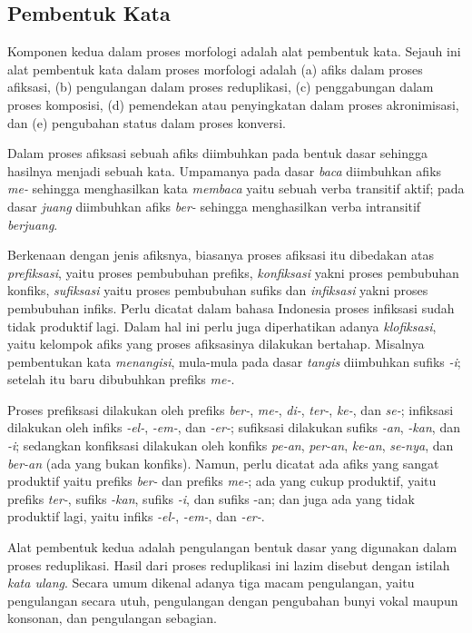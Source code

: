 \subsection{Pembentuk Kata}
\label{sec:pembentukKata}

Komponen kedua dalam proses morfologi adalah alat pembentuk kata. Sejauh ini alat pembentuk kata dalam proses morfologi adalah (a) afiks dalam proses afiksasi, (b) pengulangan dalam proses reduplikasi, (c) penggabungan dalam proses komposisi, (d) pemendekan atau penyingkatan dalam proses akronimisasi, dan (e) pengubahan status dalam proses konversi.

Dalam proses afiksasi sebuah afiks diimbuhkan pada bentuk dasar sehingga hasilnya menjadi sebuah kata. Umpamanya pada dasar \textit{baca} diimbuhkan afiks \textit{me-} sehingga menghasilkan kata \textit{membaca} yaitu sebuah verba transitif aktif; pada dasar \textit{juang} diimbuhkan afiks \textit{ber-} sehingga menghasilkan verba intransitif \textit{berjuang}.

Berkenaan dengan jenis afiksnya, biasanya proses afiksasi itu dibedakan atas \textit{prefiksasi}, yaitu proses pembubuhan prefiks, \textit{konfiksasi} yakni proses pembubuhan konfiks, \textit{sufiksasi} yaitu proses pembubuhan sufiks dan \textit{infiksasi} yakni proses pembubuhan infiks. Perlu dicatat dalam bahasa Indonesia proses infiksasi sudah tidak produktif lagi. Dalam hal ini perlu juga diperhatikan adanya \textit{klofiksasi}, yaitu kelompok afiks yang proses afiksasinya dilakukan bertahap. Misalnya pembentukan kata \textit{menangisi}, mula-mula pada dasar \textit{tangis} diimbuhkan sufiks \textit{-i}; setelah itu baru dibubuhkan prefiks \textit{me-}.

Proses prefiksasi dilakukan oleh prefiks \textit{ber-}, \textit{me-}, \textit{di-}, \textit{ter-}, \textit{ke-}, dan \textit{se-}; infiksasi dilakukan oleh infiks \textit{-el-}, \textit{-em-}, dan \textit{-er-}; sufiksasi dilakukan sufiks \textit{-an}, \textit{-kan}, dan \textit{-i}; sedangkan konfiksasi dilakukan oleh konfiks \textit{pe-an}, \textit{per-an}, \textit{ke-an}, \textit{se-nya}, dan \textit{ber-an} (ada yang bukan konfiks). Namun, perlu dicatat ada afiks yang sangat produktif yaitu prefiks \textit{ber-} dan prefiks \textit{me-}; ada yang cukup produktif, yaitu prefiks \textit{ter-}, sufiks \textit{-kan}, sufiks \textit{-i}, dan sufiks -an; dan juga ada yang tidak produktif lagi, yaitu infiks \textit{-el-}, \textit{-em-}, dan \textit{-er-}.

Alat pembentuk kedua adalah pengulangan bentuk dasar yang digunakan dalam proses reduplikasi. Hasil dari proses reduplikasi ini lazim disebut dengan istilah \textit{kata ulang}. Secara umum dikenal adanya tiga macam pengulangan, yaitu pengulangan secara utuh, pengulangan dengan pengubahan bunyi vokal maupun konsonan, dan pengulangan sebagian.

